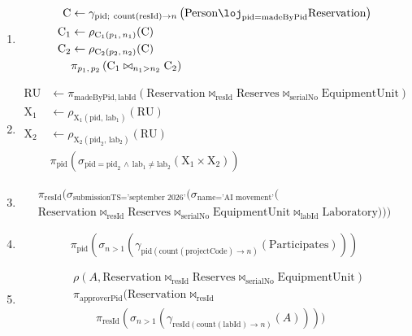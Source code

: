 \documentclass[11pt,a4paper]{article}
\begin{document}
\begin{enumerate}
    \item[\textbf{7.}]
    \[
    \begin{aligned}
    \text{C} &\leftarrow \gamma_{\text{pid};\ \text{count}(\text{resId}) \to n} \left( \text{Person} \loj_{\text{pid}=\text{madeByPid}} \text{Reservation} \right) \\
    \text{C}_1 &\leftarrow \rho_{\text{C}_1(p_1,\,n_1)} (\text{C}) \\
    \text{C}_2 &\leftarrow \rho_{\text{C}_2(p_2,\,n_2)} (\text{C}) \\
    &\pi_{p_1,\,p_2} \left( \text{C}_1 \bowtie_{n_1 > n_2} \text{C}_2 \right)
    \end{aligned}
    \]

    \item[\textbf{8.}]
    \[
    \begin{aligned}
    \text{RU} &\leftarrow \pi_{\text{madeByPid},\,\text{labId}} \left( \text{Reservation} \bowtie_{\text{resId}} \text{Reserves} \bowtie_{\text{serialNo}} \text{EquipmentUnit} \right) \\
    \text{X}_1 &\leftarrow \rho_{\text{X}_1(\text{pid},\,\text{lab}_1)} (\text{RU}) \\
    \text{X}_2 &\leftarrow \rho_{\text{X}_2(\text{pid}_2,\,\text{lab}_2)} (\text{RU}) \\
    &\pi_{\text{pid}} \left( \sigma_{\text{pid}=\text{pid}_2 \,\land\, \text{lab}_1 \neq \text{lab}_2} (\text{X}_1 \times \text{X}_2) \right)
    \end{aligned}
    \]

    \item[\textbf{9.}] 
    \[
    \begin{multlined}
    \pi_{\text{resId}} \Big( \sigma_{\text{submissionTS}=\text{'september 2026'}} \Big( \sigma_{\text{name}=\text{'AI movement'}} \Big( \\
    \text{Reservation} \bowtie_{\text{resId}} \text{Reserves} \bowtie_{\text{serialNo}} \text{EquipmentUnit} \bowtie_{\text{labId}} \text{Laboratory} \Big) \Big) \Big)
    \end{multlined}
    \]

    \item[\textbf{10.}] 
    \[
    \pi_{\text{pid}} \left( \sigma_{n>1} \left( \gamma_{\text{pid} (\text{count}(\text{projectCode}) \to n)} (\text{Participates}) \right) \right)
    \]

    \item[\textbf{11.}] 
    \[
    \begin{aligned}
    &\rho(A, \text{Reservation} \bowtie_{\text{resId}} \text{Reserves} \bowtie_{\text{serialNo}} \text{EquipmentUnit}) \\
    &\pi_{\text{approverPid}} \Big( \text{Reservation} \bowtie_{\text{resId}} \\
    &\qquad \pi_{\text{resId}} \left( \sigma_{n>1} \left( \gamma_{\text{resId} (\text{count}(\text{labId}) \to n)} (A) \right) \right) \Big)
    \end{aligned}
    \]


\end{enumerate}
\end{document}
